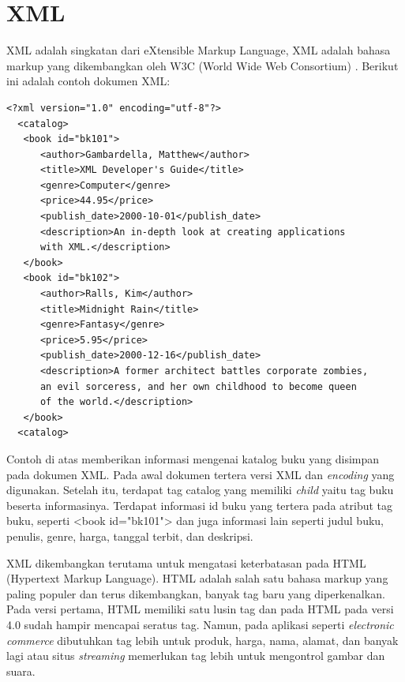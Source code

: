 \section{XML}
XML adalah singkatan dari eXtensible Markup Language, XML adalah bahasa markup 
yang dikembangkan oleh W3C (World Wide Web Consortium)
\cite{Benoit:2000}. Berikut ini adalah contoh dokumen XML:
\lstset{basicstyle=\normalsize}
\begin{lstlisting}
<?xml version="1.0" encoding="utf-8"?>
  <catalog>
   <book id="bk101">
      <author>Gambardella, Matthew</author>
      <title>XML Developer's Guide</title>
      <genre>Computer</genre>
      <price>44.95</price>
      <publish_date>2000-10-01</publish_date>
      <description>An in-depth look at creating applications 
      with XML.</description>
   </book>
   <book id="bk102">
      <author>Ralls, Kim</author>
      <title>Midnight Rain</title>
      <genre>Fantasy</genre>
      <price>5.95</price>
      <publish_date>2000-12-16</publish_date>
      <description>A former architect battles corporate zombies, 
      an evil sorceress, and her own childhood to become queen 
      of the world.</description>
   </book>
  <catalog>
\end{lstlisting}
Contoh di atas memberikan informasi mengenai katalog buku yang disimpan pada
dokumen XML. Pada awal dokumen tertera versi XML dan \textit{encoding} yang
digunakan. Setelah itu, terdapat tag catalog yang memiliki \textit{child} yaitu
tag buku beserta informasinya. Terdapat informasi id buku yang tertera pada atribut tag buku,
seperti <book id="bk101"> dan juga informasi lain seperti judul buku, penulis,
genre, harga, tanggal terbit, dan deskripsi.

XML dikembangkan terutama 
untuk mengatasi keterbatasan pada HTML (Hypertext Markup Language). HTML adalah 
salah satu bahasa markup yang paling populer dan terus dikembangkan, banyak tag baru 
yang diperkenalkan. Pada versi pertama, HTML memiliki satu lusin tag dan pada
HTML pada versi 4.0 sudah hampir mencapai seratus tag. Namun, pada aplikasi
seperti \textit{electronic commerce} dibutuhkan tag lebih untuk produk, harga, nama,
alamat, dan banyak lagi atau situs \textit{streaming} memerlukan tag lebih untuk
mengontrol gambar dan suara.
\lstset{language=XML}

